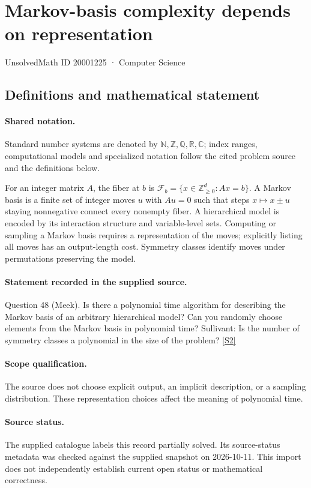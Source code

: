 \documentclass[11pt]{article}
\newcommand{\sref}[2]{\hyperlink{source:#1:#2}{[S#2]}}
\begin{document}
\setcounter{section}{20001224}
\section{Markov-basis complexity depends on representation}\label{20001225}
{\small\sffamily UnsolvedMath ID 20001225 · Computer Science}
\subsection{Definitions and mathematical statement}

\paragraph{Shared notation.}Standard number systems are denoted by $\mathbb N,\mathbb Z,\mathbb Q,\mathbb R,\mathbb C$; index ranges, computational models and specialized notation follow the cited problem source and the definitions below.


For an integer matrix $A$, the fiber at $b$ is $\mathcal F_b=\{x\in\mathbb Z_{\ge0}^d:Ax=b\}$. A Markov basis is a finite set of integer moves $u$ with $Au=0$ such that steps $x\mapsto x\pm u$ staying nonnegative connect every nonempty fiber. A hierarchical model is encoded by its interaction structure and variable-level sets. Computing or sampling a Markov basis requires a representation of the moves; explicitly listing all moves has an output-length cost. Symmetry classes identify moves under permutations preserving the model.
\paragraph{Statement recorded in the supplied source.}
Question 48 (Meek). Is there a polynomial time algorithm for describing the Markov basis of an arbitrary hierarchical model? Can you randomly choose elements from the Markov basis in polynomial time? Sullivant: Is the number of symmetry classes a polynomial in the size of the problem? \sref{20001225}{2}
\paragraph{Scope qualification.}
The source does not choose explicit output, an implicit description, or a sampling distribution. These representation choices affect the meaning of polynomial time.
\paragraph{Source status.}
The supplied catalogue labels this record partially solved. Its source-status metadata was checked against the supplied snapshot on 2026-10-11. This import does not independently establish current open status or mathematical correctness.
\end{document}
